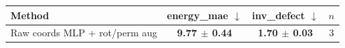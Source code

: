 \begin{tabular}{lccc}
\toprule
Method & energy\_mae $\downarrow$ & inv\_defect $\downarrow$ & $n$ \\
\midrule
Raw coords MLP + rot/perm aug & \textbf{9.77 $\pm$ 0.44} & \textbf{1.70 $\pm$ 0.03} & 3 \\
\bottomrule
\end{tabular}
